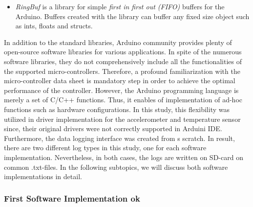 \documentclass[english,12pt,a4paper,pdftex,elec,utf8]{aaltothesis}
\begin{document}
\begin{itemize}
\item \textit{RingBuf} is a library for simple \textit{first in first out (FIFO)} buffers for the Arduino. Buffers created with the library can buffer any fixed size object such as ints, floats and structs. \cite{arduinoringbuf}
\end{itemize} In addition to the standard libraries, Arduino community provides plenty of open-source software libraries for various applications. In spite of the numerous software libraries, they do not comprehensively include all the functionalities of the supported micro-controllers. Therefore, a profound familiarization with the micro-controller data sheet is mandatory step in order to achieve the optimal performance of the controller. However, the Arduino programming language is merely a set of C/C++ functions. Thus, it enables of implementation of ad-hoc functions such as hardware configurations. In this study, this flexibility was utilized in driver implementation for the accelerometer and temperature sensor since, their original drivers were not correctly supported in Arduini IDE. Furthermore, the data logging interface was created from s scratch. In result, there are two different log types in this study, one for each software implementation. Nevertheless, in both cases, the logs are written on SD-card on common .txt-files. In the following subtopics, we will discuss both software implementations in detail.




\subsubsection*{First Software Implementation ok}\label{firstdatasetconfigurations}



\end{document}
